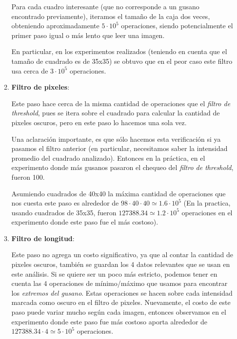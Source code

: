 \documentclass{article}
\begin{document}
\begin{enumerate}[topsep=0pt]
\begin{enumerate}
\hspace{0.2cm} Para cada cuadro interesante (que no corresponde a un gusano encontrado previamente), iteramos el tamaño de la caja dos veces, obteniendo aproximadamente $5 \cdot 10^5$ operaciones, siendo potencialmente el primer paso igual o más lento que leer una imagen.

\hspace{0.2cm} En particular, en los experimentos realizados (teniendo en cuenta que el tamaño de cuadrado es de 35x35) se obtuvo que en el peor caso este filtro usa cerca de $3 \cdot 10^5$ operaciones.

\item \textbf{Filtro de pixeles}:

\hspace{0.2cm} Este paso hace cerca de la misma cantidad de operaciones que el \emph{filtro de threshold}, pues se itera sobre el cuadrado para calcular la cantidad de pixeles oscuros, pero en este paso lo hacemos una sola vez.

\hspace{0.2cm} Una aclaración importante, es que sólo hacemos esta verificación si ya pasamos el filtro anterior (en particular, necesitamos saber la intensidad promedio del cuadrado analizado). Entonces en la práctica, en el experimento donde más gusanos pasaron el chequeo del \emph{filtro de threshold}, fueron 100.

\hspace{0.2cm} Asumiendo cuadrados de 40x40 la máxima cantidad de operaciones que nos cuesta este paso es alrededor de $98\cdot40\cdot40 \simeq 1.6 \cdot 10^5$ (En la practica, usando cuadrados de 35x35, fueron $127388.34 \simeq 1.2 \cdot 10^5$ operaciones en el experimento donde este paso fue el más costoso).

\item \textbf{Filtro de longitud}:

\hspace{0.2cm} Este paso no agrega un costo significativo, ya que al contar la cantidad de pixeles oscuros, también se guardan los 4 datos relevantes que se usan en este análisis. Si se quiere ser un poco más estricto, podemos tener en cuenta las 4 operaciones de mínimo/máximo que usamos para encontrar los \emph{extremos del gusano}. Estas operaciones se hacen sobre cada intensidad marcada como oscuro en el filtro de pixeles. Nuevamente, el costo de este paso puede variar mucho según cada imagen, entonces observamos en el experimento donde este paso fue más costoso aporta alrededor de $127388.34 \cdot 4 \simeq 5 \cdot 10^5$ operaciones.


\end{enumerate}
\end{enumerate}
\end{document}
